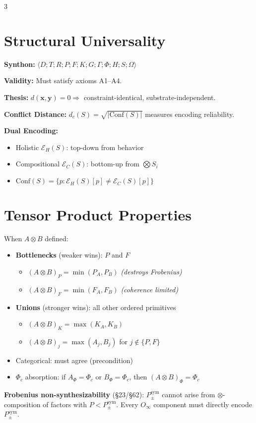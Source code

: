\documentclass[8pt,a4paper,landscape]{article}
\begin{document}
\begin{multicols}{3}
\section*{Structural Universality}
\footnotesize
\textbf{Synthon:} $\langle D;T;R;P;F;K;G;\Gamma;\Phi;H;S;\Omega\rangle$

\textbf{Validity:} Must satisfy axioms A1–A4.

\textbf{Thesis:} $d(\mathbf{x},\mathbf{y})=0 \Rightarrow$ constraint-identical, substrate-independent.

\textbf{Conflict Distance:} $d_c(S)=\sqrt{|\text{Conf}(S)|}$ measures encoding reliability.

\textbf{Dual Encoding:}
\begin{itemize}[leftmargin=*,nosep,topsep=4pt,itemsep=2pt]
\item Holistic $\mathcal{E}_H(S)$: top-down from behavior
\item Compositional $\mathcal{E}_C(S)$: bottom-up from $\bigotimes S_i$
\item $\text{Conf}(S) = \{p : \mathcal{E}_H(S)[p] \neq \mathcal{E}_C(S)[p]\}$
\end{itemize}

\section*{Tensor Product Properties}
\footnotesize
When $A\otimes B$ defined:
\begin{itemize}[leftmargin=*,nosep,topsep=4pt,itemsep=2pt]
\item \textbf{Bottlenecks} (weaker wins): $P$ and $F$
  \begin{itemize}[nosep,label={--}]
  \item $(A\otimes B)_P = \min(P_A, P_B)$ \quad\textit{(destroys Frobenius)}
  \item $(A\otimes B)_F = \min(F_A, F_B)$ \quad\textit{(coherence limited)}
  \end{itemize}
\item \textbf{Unions} (stronger wins): all other ordered primitives
  \begin{itemize}[nosep,label={--}]
  \item $(A\otimes B)_K = \max(K_A, K_B)$
  \item $(A\otimes B)_j = \max(A_j, B_j)$ for $j\notin\{P,F\}$
  \end{itemize}
\item Categorical: must agree (precondition)
\item $\Phi_c$ absorption: if $A_\Phi{=}\Phi_c$ or $B_\Phi{=}\Phi_c$, then $(A\otimes B)_\Phi{=}\Phi_c$
\end{itemize}
\textbf{Frobenius non-synthesizability} (\S23/\S62): $P_\pm^{\text{sym}}$ cannot arise from $\otimes$-composition of factors with $P<P_\pm^{\text{sym}}$. Every $O_\infty$ component must directly encode $P_\pm^{\text{sym}}$.


\end{multicols}
\end{document}
